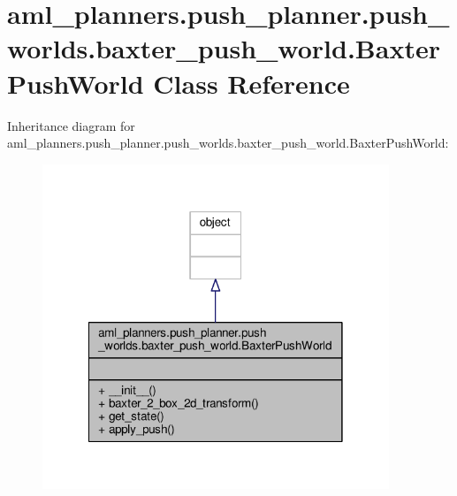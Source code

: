 \hypertarget{classaml__planners_1_1push__planner_1_1push__worlds_1_1baxter__push__world_1_1_baxter_push_world}{\section{aml\-\_\-planners.\-push\-\_\-planner.\-push\-\_\-worlds.\-baxter\-\_\-push\-\_\-world.\-Baxter\-Push\-World Class Reference}
\label{classaml__planners_1_1push__planner_1_1push__worlds_1_1baxter__push__world_1_1_baxter_push_world}
}


Inheritance diagram for aml\-\_\-planners.\-push\-\_\-planner.\-push\-\_\-worlds.\-baxter\-\_\-push\-\_\-world.\-Baxter\-Push\-World\-:
\nopagebreak
\begin{figure}[H]
\begin{center}
\leavevmode
\includegraphics[width=294pt]{classaml__planners_1_1push__planner_1_1push__worlds_1_1baxter__push__world_1_1_baxter_push_world__inherit__graph}
\end{center}
\end{figure}


